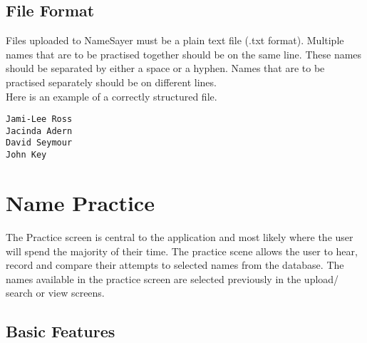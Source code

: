 \documentclass{article}
\begin{document}
\subsection{File Format}
Files uploaded to NameSayer must be a plain text file (.txt format). 
Multiple names that are to be practised together should be on the 
same line. These names should be separated by either a space or a hyphen. Names that are to be practised separately should be on different lines. \\

Here is an example of a correctly structured file.
\begin{verbatim}
Jami-Lee Ross
Jacinda Adern
David Seymour
John Key
\end{verbatim}

\section{Name Practice}
The Practice screen is central to the application and most likely where the user will spend the majority of their time. The practice
scene allows the user to hear, record and compare their attempts to selected names from the database. The names available 
in the practice screen are selected previously in the upload/ search or view screens. 

\subsection{Basic Features}
\end{document}
